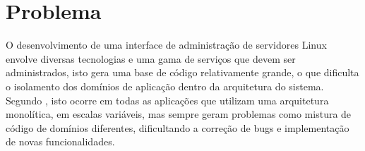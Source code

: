 \section{Problema}

  O desenvolvimento de uma interface de administração de servidores Linux
  envolve diversas tecnologias e uma gama de serviços que devem ser
  administrados, isto gera uma base de código relativamente grande, o que
  dificulta o isolamento dos domínios de aplicação dentro da arquitetura
  do sistema. Segundo \cite{Newman2015}, isto ocorre em todas as aplicações
  que utilizam uma arquitetura monolítica, em escalas variáveis, mas sempre
  geram problemas como mistura de código de domínios diferentes, dificultando
  a correção de bugs e implementação de novas funcionalidades.
